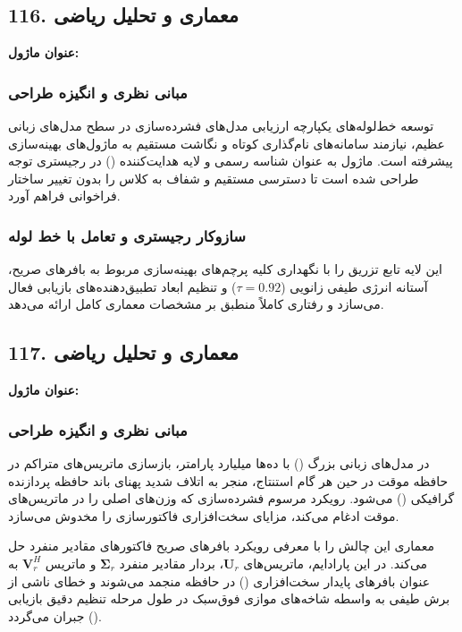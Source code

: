 \documentclass[12pt,a4paper]{report}
\begin{document}
\subsection*{116. معماری و تحلیل ریاضی }
\textbf{عنوان ماژول:} 

\subsubsection*{مبانی نظری و انگیزه طراحی}
توسعه خط‌لوله‌های یکپارچه ارزیابی مدل‌های فشرده‌سازی در سطح مدل‌های زبانی عظیم، نیازمند سامانه‌های نام‌گذاری کوتاه و نگاشت مستقیم به ماژول‌های بهینه‌سازی پیشرفته است. ماژول  به عنوان شناسه رسمی و لایه هدایت‌کننده () در رجیستری توجه طراحی شده است تا دسترسی مستقیم و شفاف به کلاس  را بدون تغییر ساختار فراخوانی فراهم آورد.

\subsubsection*{سازوکار رجیستری و تعامل با خط لوله}
این لایه تابع تزریق  را با نگهداری کلیه پرچم‌های بهینه‌سازی مربوط به بافرهای صریح، آستانه انرژی طیفی زانویی ($\tau = 0.92$) و تنظیم ابعاد تطبیق‌دهنده‌های بازیابی  فعال می‌سازد و رفتاری کاملاً منطبق بر مشخصات معماری کامل  ارائه می‌دهد.

\subsection*{117. معماری و تحلیل ریاضی }
\textbf{عنوان ماژول:} 

\subsubsection*{مبانی نظری و انگیزه طراحی}
در مدل‌های زبانی بزرگ () با ده‌ها میلیارد پارامتر، بازسازی ماتریس‌های متراکم در حافظه موقت در حین هر گام استنتاج، منجر به اتلاف شدید پهنای باند حافظه پردازنده گرافیکی () می‌شود. رویکرد مرسوم فشرده‌سازی  که وزن‌های اصلی را در ماتریس‌های موقت ادغام می‌کند، مزایای سخت‌افزاری فاکتورسازی را مخدوش می‌سازد.

معماری  این چالش را با معرفی رویکرد بافرهای صریح فاکتورهای مقادیر منفرد حل می‌کند. در این پارادایم، ماتریس‌های $\mathbf{U}_r$، بردار مقادیر منفرد $\mathbf{\Sigma}_r$ و ماتریس $\mathbf{V}_r^H$ به عنوان بافرهای پایدار سخت‌افزاری () در حافظه منجمد می‌شوند و خطای ناشی از برش طیفی به واسطه شاخه‌های موازی فوق‌سبک  در طول مرحله تنظیم دقیق بازیابی () جبران می‌گردد.
\end{document}
